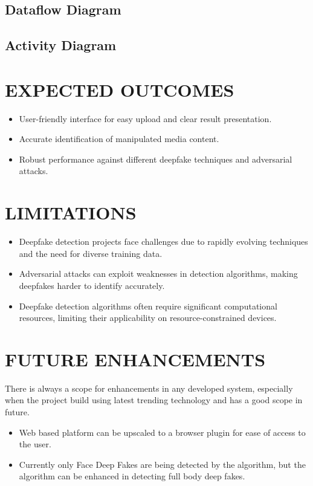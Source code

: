 \documentclass[12 pt]{article}
\begin{document}
\subsection{Dataflow Diagram}
\newpage
\subsection{Activity Diagram}
\newpage


\section{EXPECTED OUTCOMES}
\begin{itemize}
    \item User-friendly interface for easy upload and clear result presentation.
    \item Accurate identification of manipulated media content.
    \item Robust performance against different deepfake techniques and adversarial attacks.
\end{itemize}
\newpage
\section{LIMITATIONS}
\begin{itemize}
    \item Deepfake detection projects face challenges due to rapidly evolving techniques and the need for diverse training data.
    \item Adversarial attacks can exploit weaknesses in detection algorithms, making deepfakes harder to identify accurately.
    \item Deepfake detection algorithms often require significant computational resources, limiting their applicability on resource-constrained devices.
\end{itemize}
\newpage
\section{FUTURE ENHANCEMENTS}
There is always a scope for enhancements in any developed system, especially
when the project build using latest trending technology and has a good scope in
future.
\begin{itemize}
    \item Web based platform can be upscaled to a browser plugin for ease of access to
          the user.
    \item Currently only Face Deep Fakes are being detected by the algorithm, but the
          algorithm can be enhanced in detecting full body deep fakes.
\end{itemize}
\newpage
\end{document}

